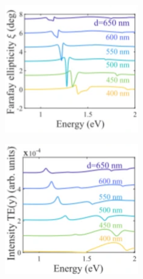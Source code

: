 \documentclass[13pt]{article}
\begin{document}
\begin{figure}[hbt]
	\begin{subfigure}[]{.49\linewidth}
		\centering
		\includegraphics[width=\linewidth]{Figures/figure4c.png}
		\caption{}
		\label{fig:figure4c}
	\end{subfigure}
	\hfill
	\begin{subfigure}[]{.49\linewidth}
		\centering
		\includegraphics[width=\linewidth]{Figures/figure4d.png}

\end{subfigure}
\end{figure}
\end{document}
